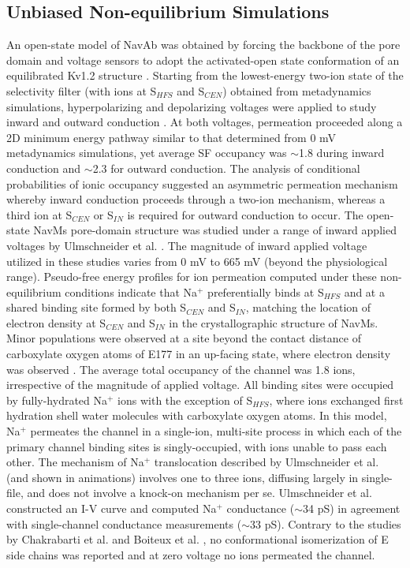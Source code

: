 \begin{refsection}
  \subsection{Unbiased Non-equilibrium Simulations}
An open-state model of NavAb was obtained by forcing the backbone of the pore domain and voltage sensors to adopt the activated-open state conformation of an equilibrated Kv1.2 structure \cite{Amaral:2012tn,Treptow:2006gl}.  Starting from the lowest-energy two-ion state of the selectivity filter (with ions at S$_{HFS}$ and S$_{CEN}$) obtained from metadynamics simulations, hyperpolarizing and depolarizing voltages were applied to study inward and outward conduction \cite{Stock:2013cg}.  At both voltages, permeation proceeded along a 2D minimum energy pathway similar to that determined from 0 mV metadynamics simulations, yet average SF occupancy was $\sim$1.8 during inward conduction and $\sim$2.3 for outward conduction.  The analysis of conditional probabilities of ionic occupancy suggested an asymmetric permeation mechanism whereby inward conduction proceeds through a two-ion mechanism, whereas a third ion at S$_{CEN}$ or S$_{IN}$ is required for outward conduction to occur.
The open-state NavMs pore-domain structure was studied under a range of inward applied voltages by Ulmschneider et al. \cite{Ulmschneider:2013da}. The magnitude of inward applied voltage utilized in these studies varies from 0 mV to 665 mV (beyond the physiological range). Pseudo-free energy profiles for ion permeation computed under these non-equilibrium conditions indicate that Na$^{+}$ preferentially binds at S$_{HFS}$ and at a shared binding site formed by both S$_{CEN}$ and S$_{IN}$, matching the location of electron density at S$_{CEN}$ and S$_{IN}$ in the crystallographic structure of NavMs.  Minor populations were observed at a site beyond the contact distance of carboxylate oxygen atoms of E177 in an up-facing state, where electron density was observed \cite{McCusker:2012di,Ulmschneider:2013da}.  The average total occupancy of the channel was 1.8 ions, irrespective of the magnitude of applied voltage.  All binding sites were occupied by fully-hydrated Na$^{+}$ ions with the exception of S$_{HFS}$, where ions exchanged first hydration shell water molecules with carboxylate oxygen atoms.  In this model, Na$^{+}$ permeates the channel in a single-ion, multi-site process in which each of the primary channel binding sites is singly-occupied, with ions unable to pass each other.  The mechanism of Na$^{+}$ translocation described by Ulmschneider et al. (and shown in animations) involves one to three ions, diffusing largely in single-file, and does not involve a knock-on mechanism per se.  Ulmschneider et al. constructed an I-V curve and computed Na$^{+}$ conductance ($\sim$34 pS) in agreement with single-channel conductance measurements ($\sim$33 pS).  Contrary to the studies by Chakrabarti et al. \cite{Chakrabarti:2013kd} and Boiteux et al. \cite{Boiteux:2014ut}, no conformational isomerization of E side chains was reported and at zero voltage no ions permeated the channel. 

\end{refsection}
